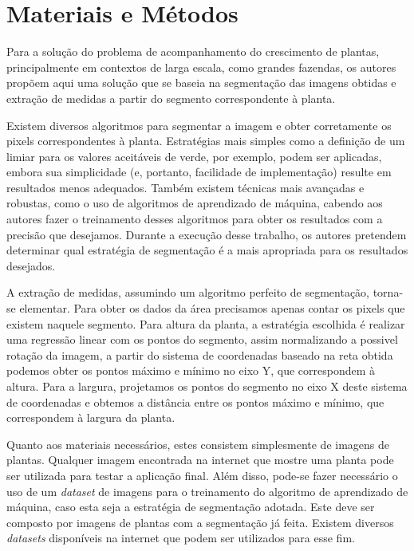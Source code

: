 \chapter{Materiais e Métodos}

Para a solução do problema de acompanhamento do crescimento de plantas, principalmente em contextos de larga escala, como grandes fazendas, os autores propõem aqui uma solução que se baseia na segmentação das imagens obtidas e extração de medidas a partir do segmento correspondente à planta.

Existem diversos algoritmos para segmentar a imagem e obter corretamente os pixels correspondentes à planta. Estratégias mais simples como a definição de um limiar para os valores aceitáveis de verde, por exemplo, podem ser aplicadas, embora sua simplicidade (e, portanto, facilidade de implementação) resulte em resultados menos adequados. Também existem técnicas mais avançadas e robustas, como o uso de algoritmos de aprendizado de máquina, cabendo aos autores fazer o treinamento desses algoritmos para obter os resultados com a precisão que desejamos. Durante a execução desse trabalho, os autores pretendem determinar qual estratégia de segmentação é a mais apropriada para os resultados desejados.

A extração de medidas, assumindo um algoritmo perfeito de segmentação, torna-se elementar. Para obter os dados da área precisamos apenas contar os pixels que existem naquele segmento. Para altura da planta, a estratégia escolhida é realizar uma regressão linear com os pontos do segmento, assim normalizando a possivel rotação da imagem, a partir do sistema de coordenadas baseado na reta obtida podemos obter os pontos máximo e mínimo no eixo Y, que correspondem à altura. Para a largura, projetamos os pontos do segmento no eixo X deste sistema de coordenadas e obtemos a distância entre os pontos máximo e mínimo, que correspondem à largura da planta.

Quanto aos materiais necessários, estes consistem simplesmente de imagens de plantas. Qualquer imagem encontrada na internet que mostre uma planta pode ser utilizada para testar a aplicação final. Além disso, pode-se fazer necessário o uso de um \textit{dataset} de imagens para o treinamento do algoritmo de aprendizado de máquina, caso esta seja a estratégia de segmentação adotada. Este deve ser composto por imagens de plantas com a segmentação já feita. Existem diversos \textit{datasets} disponíveis na internet que podem ser utilizados para esse fim.

